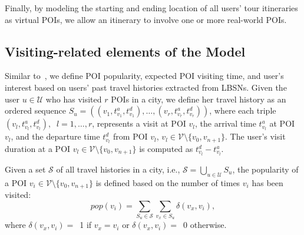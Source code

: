 Finally, by modeling the starting and ending location of all users' tour itineraries as virtual POIs, we allow an itinerary to involve one or more real-world POIs.


\subsection{Visiting-related {elements of the Model}}
\label{sec:model-2}
Similar to~\cite{choudhury-automatic:10,brilhante-where:13,lim-personalized:18}, we define POI popularity, expected POI visiting time, and user's interest based on users' past travel histories extracted from LBSNs. Given the user $u \in \mathcal{U}$ who has visited $r$ POIs in a city, we define her travel history as an ordered sequence $S_u= ((v_1, t_{v_1}^a, t_{v_1}^d), \dots, (v_r, t_{v_r}^a, t_{v_r}^d))$, where each triple $(v_l, t_{v_l}^a, t_{v_l}^d),$ $\ l=1,\dots, r$, represents a visit at POI $v_l$, the arrival time $t_{v_l}^a$ at POI $v_l$, and the departure time $t_{v_l}^d$ from POI $v_l$, $v_{l} \in \mathcal{V} \setminus \{v_{0}, v_{n+1}\}$. The user's visit duration at a POI $v_{l} \in \mathcal{V} \setminus \{v_{0}, v_{n+1}\}$ is computed as $t_{v_l}^d - t_{v_l}^a$.

Given a set $\mathcal{S}$ of all travel histories in a city, i.e., $\mathcal{S}=\bigcup_{u \in \mathcal{U}} S_u$, the popularity of a POI $v_{i} \in \mathcal{V} \setminus \{v_{0}, v_{n+1}\}$ is defined based on the number of times $v_i$ has been visited:%
\begin{equation}
\label{eq:pop}
pop(v_{i}) = \sum\limits_{S_u \in \mathcal{S}}\sum\limits_{v_{x} \in S_u} \delta(v_{x},v_{i}),
\end{equation}
where $\delta(v_{x},v_{i})=$~1 if $v_{x}=v_{i}$ or $\delta(v_{x},v_{i})=$~0 otherwise.

